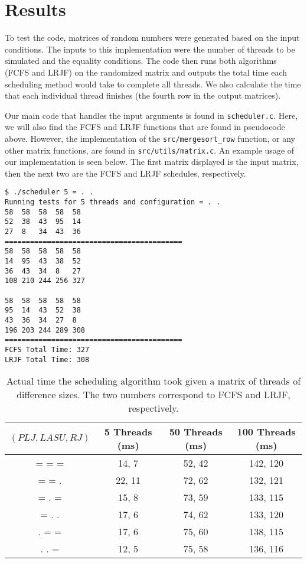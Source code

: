 \documentclass[letterpaper,12pt]{article}
\begin{document}
\section{Results}
To test the code, matrices of random numbers were generated based on the input conditions.
The inputs to this implementation were the number of threads to be simulated and the equality conditions.
The code then runs both algorithms (FCFS and LRJF) on the randomized matrix and outputs the total time each scheduling method would take to complete all threads. 
We also calculate the time that each individual thread finishes (the fourth row in the output matrices). 

Our main code that handles the input arguments is found in \texttt{scheduler.c}.
Here, we will also find the FCFS and LRJF functions that are found in pseudocode above.
However, the implementation of the \texttt{src/mergesort\_row} function, or any other matrix functions, are found in \texttt{src/utils/matrix.c}.
An example usage of our implementation is seen below. 
The first matrix displayed is the input matrix, then the next two are the FCFS and LRJF schedules, respectively.

\begin{verbatim}
$ ./scheduler 5 = . .
Running tests for 5 threads and configuration = . .
58	58	58	58	58	
52	38	43	95	14	
27	8	34	43	36	
==========================================
58	58	58	58	58	
14	95	43	38	52	
36	43	34	8	27	
108	210	244	256	327	

58	58	58	58	58	
95	14	43	52	38	
43	36	34	27	8	
196	203	244	289	308
==========================================
FCFS Total Time: 327
LRJF Total Time: 308
\end{verbatim}

\begin{table}[ht]
\begin{center}
\caption{Actual time the scheduling algorithm took given a matrix of threads of difference sizes. The two numbers correspond to FCFS and LRJF, respectively.}
\begin{tabular}{|c|ccc|} 
\hline
\multicolumn{1}{|c|}{$(PLJ, LASU, RJ)$} &
\multicolumn{1}{c}{5 Threads (ms)} &
\multicolumn{1}{c}{50 Threads (ms)} &
\multicolumn{1}{c|}{100 Threads (ms)} \\
\hline
= = = & 14, 7 & 52, 42 & 142, 120 \\
= = . & 22, 11 & 72, 62 & 132, 121 \\
= . = & 15, 8 & 73, 59 & 133, 115 \\
= . . & 17, 6 & 74, 62 & 133, 120 \\
. = = & 17, 6 & 75, 60 & 138, 115 \\
. . = & 12, 5 & 75, 58 & 136, 116 \\
\hline
\end{tabular}
\end{center}
\end{table}
\end{document}
